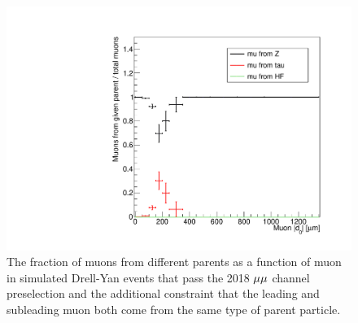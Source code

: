 \begin{figure}
\centering
\includegraphics[scale=0.35]{figures/bg/mumu_DY_muonAbsD0_1000um_variableBins_coarse_ratios.pdf}
\caption{The fraction of muons from different parents as a function of muon \ad in simulated Drell-Yan events that pass the 2018 ${\mu}{\mu}$ channel preselection and the additional constraint that the leading and subleading muon both come from the same type of parent particle.}
\label{dy_d0_behavior}
\end{figure}
